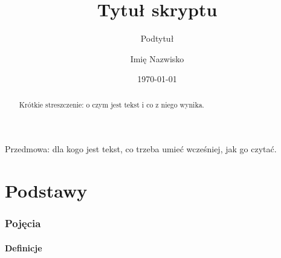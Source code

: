 \documentclass[a4paper, polish, 11pt]{scrartcl}
\title{Tytuł skryptu}
\subtitle{Podtytuł}
\author{Imię Nazwisko}
\date{\today}
\begin{document}
\maketitle

\begin{abstract}
Krótkie streszczenie: o czym jest tekst i co z niego wynika.
\end{abstract}

\begin{preface}
Przedmowa: dla kogo jest tekst, co trzeba umieć wcześniej, jak go czytać.
\end{preface}

\tableofcontents

\part{Podstawy}

\section{Pojęcia}\label{sec:pojecia}

\subsection{Definicje}\label{sec:definicje}
\end{document}
